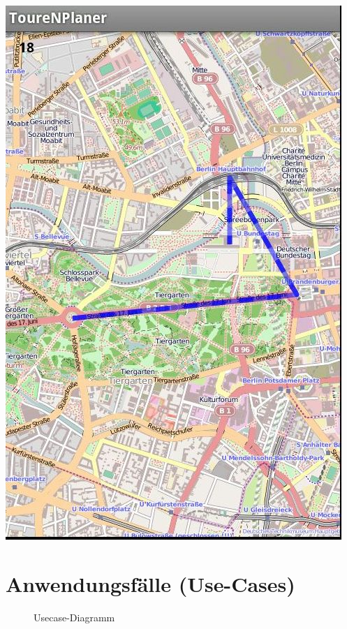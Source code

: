 \documentclass[a4paper,10pt,titlepage]{article}
\newcommand{\usecase}[8]
{\subsection{#1}
\begin{tabular}{|p{0.2\textwidth}|p{0.7\textwidth}|}
\hline
  Akteur & #2\\\hline
  Ziel & #3\\\hline
  Vorbedingung & #4\\\hline
  Normalablauf & #7\\\hline
  Nachbedingung & #5\\\hline
  Sonderfall & #8\\\hline
  Nachbedingung im Sonderfall& #6\\\hline
 \end{tabular}
}
\begin{document}
\begin {center}
\includegraphics[scale=0.4]{media/android/map.jpg}
\end {center}
\newpage



\clearpage
\section{Anwendungsfälle (Use-Cases)}
\begin{figure}[H]
  \centering
  \caption{Usecase-Diagramm}
\end{figure}

\end{document}
